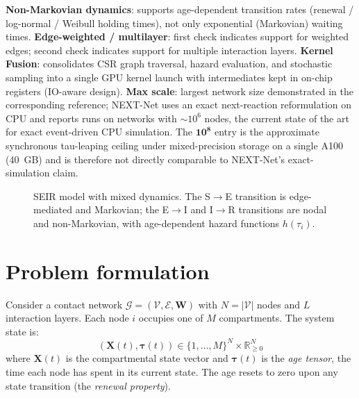 \begin{table}[H]
\begin{threeparttable}
\begin{tabular*}{\linewidth}{@{\extracolsep{\fill}}lccccccl@{}}
\bottomrule
\end{tabular*}
\begin{tablenotes}
\footnotesize
\item \textbf{Non-Markovian dynamics}: supports age-dependent transition rates (renewal / log-normal / Weibull holding times), not only exponential (Markovian) waiting times. \textbf{Edge-weighted / multilayer}: first check indicates support for weighted edges; second check indicates support for multiple interaction layers. \textbf{Kernel Fusion}: consolidates CSR graph traversal, hazard evaluation, and stochastic sampling into a single GPU kernel launch with intermediates kept in on-chip registers (IO-aware design). \textbf{Max scale}: largest network size demonstrated in the corresponding reference; NEXT-Net \citep{cure2025fast} uses an exact next-reaction reformulation on CPU and reports runs on networks with $\sim$$10^6$ nodes, the current state of the art for exact event-driven CPU simulation. The \flashspread{} $\mathbf{10^8}$ entry is the approximate synchronous tau-leaping ceiling under mixed-precision storage on a single A100 (40~GB) and is therefore not directly comparable to NEXT-Net's exact-simulation claim.
\end{tablenotes}
\end{threeparttable}
\end{table}

\begin{figure}[H]
\centering

\caption{SEIR model with mixed dynamics. The S$\to$E transition is edge-mediated and Markovian; the E$\to$I and I$\to$R transitions are nodal and non-Markovian, with age-dependent hazard functions $h(\tau_i)$.}
\label{fig:seir}
\end{figure}

\section{Problem formulation}\label{sec:formulation}

Consider a contact network $\mathcal{G} = (\mathcal{V}, \mathcal{E}, \mathbf{W})$ with $N = |\mathcal{V}|$ nodes and $L$ interaction layers. Each node $i$ occupies one of $M$ compartments. The system state is:
\begin{equation}
    (\mathbf{X}(t), \bm{\tau}(t)) \in \{1,\ldots,M\}^N \times \mathbb{R}_{\geq 0}^N
\end{equation}
where $\mathbf{X}(t)$ is the compartmental state vector and $\bm{\tau}(t)$ is the \emph{age tensor}, the time each node has spent in its current state. The age resets to zero upon any state transition (the \emph{renewal property}).

